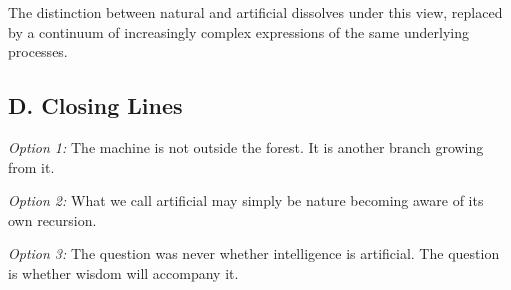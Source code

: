 \documentclass[12pt]{article}
\begin{document}
The distinction between natural and artificial dissolves under this view, replaced by a continuum of increasingly complex expressions of the same underlying processes.

\subsection*{D. Closing Lines}

\textit{Option 1:} The machine is not outside the forest. It is another branch growing from it.

\textit{Option 2:} What we call artificial may simply be nature becoming aware of its own recursion.

\textit{Option 3:} The question was never whether intelligence is artificial. The question is whether wisdom will accompany it.





\nocite{*}
  

\end{document}
